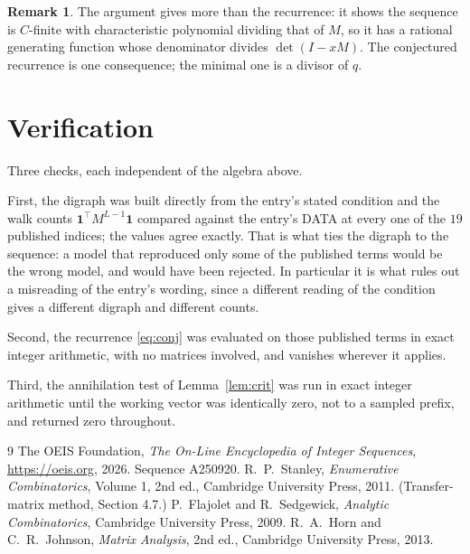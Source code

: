 \documentclass[11pt,a4paper]{article}
\theoremstyle{plain}
\theoremstyle{definition}
\newtheorem{remark}[theorem]{Remark}
\begin{document}
\begin{remark}
The argument gives more than the recurrence: it shows the sequence is $C$-finite with
characteristic polynomial dividing that of $M$, so it has a rational generating function
whose denominator divides $\det(I-xM)$. The conjectured recurrence is one consequence; the
minimal one is a divisor of $q$.
\end{remark}

\section{Verification}

Three checks, each independent of the algebra above.

First, the digraph was built directly from the entry's stated condition and the walk counts
$\mathbf{1}^{\!\top}M^{L-1}\mathbf{1}$ compared against the entry's DATA at
every one of the $19$ published indices; the values agree exactly. That is what ties
the digraph to the sequence: a model that reproduced only some of the published terms would
be the wrong model, and would have been rejected. In particular it is what rules out a
misreading of the entry's wording, since a different reading of the condition gives a
different digraph and different counts.

Second, the recurrence \eqref{eq:conj} was evaluated on those published terms in exact
integer arithmetic, with no matrices involved, and vanishes wherever it applies.

Third, the annihilation test of Lemma~\ref{lem:crit} was run in exact integer arithmetic
until the working vector was identically zero, not to a sampled prefix, and returned zero
throughout.

\begin{thebibliography}{9}
 The OEIS Foundation, \emph{The On-Line Encyclopedia of Integer
Sequences}, \url{https://oeis.org}, 2026. Sequence A250920.
 R.~P.~Stanley, \emph{Enumerative Combinatorics}, Volume 1, 2nd ed.,
Cambridge University Press, 2011. (Transfer-matrix method, Section 4.7.)
 P.~Flajolet and R.~Sedgewick, \emph{Analytic Combinatorics}, Cambridge
University Press, 2009.
 R.~A.~Horn and C.~R.~Johnson, \emph{Matrix Analysis}, 2nd ed., Cambridge
University Press, 2013.
\end{thebibliography}
\end{document}
